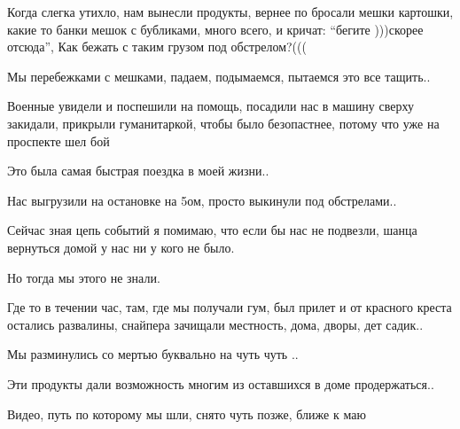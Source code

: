 Когда слегка утихло, нам вынесли продукты, вернее по бросали  мешки картошки,
какие то банки мешок с бубликами, много всего, и кричат: \enquote{бегите )))скорее
отсюда}, Как бежать с таким грузом под обстрелом?(((

Мы перебежками с мешками, падаем, подымаемся, пытаемся это все тащить..

Военные увидели и поспешили на помощь,  посадили нас в машину сверху закидали,
прикрыли гуманитаркой, чтобы было безопастнее, потому что уже на проспекте шел
бой 

Это была самая быстрая поездка в моей жизни..

Нас выгрузили  на  остановке на 5ом, просто выкинули  под обстрелами..

Сейчас зная цепь событий я помимаю, что если бы нас не подвезли, шанца
вернуться домой  у нас ни у кого не было.

Но тогда мы этого не знали.

Где то в течении час, там, где мы получали  гум, был прилет и от красного креста
остались развалины, снайпера зачищали местность, дома, дворы, дет садик..

Мы разминулись со мертью буквально на чуть чуть ..

Эти продукты дали возможность многим из оставшихся в доме продержаться..

Видео, путь по которому мы шли, снято чуть позже, ближе к маю

